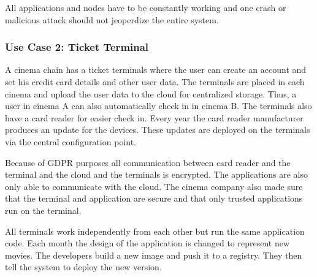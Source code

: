 All applications and nodes have to be constantly working and one crash or malicious attack should not jeoperdize the entire system.

\subsubsection{Use Case 2: Ticket Terminal}
A cinema chain has a ticket terminals where the user can create an account and set his credit card details and other user data. The terminals are placed in each cinema and upload the user data to the cloud for centralized storage. Thus, a user in cinema A can also automatically check in in cinema B. The terminals also have a card reader for easier check in. Every year the card reader manufacturer produces an update for the devices. These updates are deployed on the terminals via the central configuration point.

Because of GDPR purposes all communication between card reader and the terminal and the cloud and the terminals is encrypted. The applications are also only able to communicate with the cloud.
The cinema company also made sure that the terminal and application are secure and that only trusted applications run on the terminal.

All terminals work independently from each other but run the same application code. Each month the design of the application is changed to represent new movies. The developers build a new image and push it to a registry. They then tell the system to deploy the new version.


